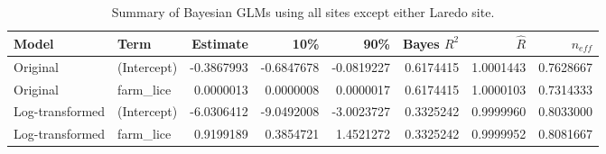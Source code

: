 \begin{table}
\centering
\caption{Summary of Bayesian GLMs using all sites except either Laredo
    site.}
\centering
\begin{tabular}[t]{llrrrrrr}
\toprule
Model & Term & Estimate & 10\% & 90\% & Bayes $R^2$ & $\hat{R}$ & $n_{eff}$\\
\midrule
Original & (Intercept) & -0.3867993 & -0.6847678 & -0.0819227 & 0.6174415 & 1.0001443 & 0.7628667\\
Original & farm_lice & 0.0000013 & 0.0000008 & 0.0000017 & 0.6174415 & 1.0000103 & 0.7314333\\
Log-transformed & (Intercept) & -6.0306412 & -9.0492008 & -3.0023727 & 0.3325242 & 0.9999960 & 0.8033000\\
Log-transformed & farm_lice & 0.9199189 & 0.3854721 & 1.4521272 & 0.3325242 & 0.9999952 & 0.8081667\\
\bottomrule
\end{tabular}
\end{table}
